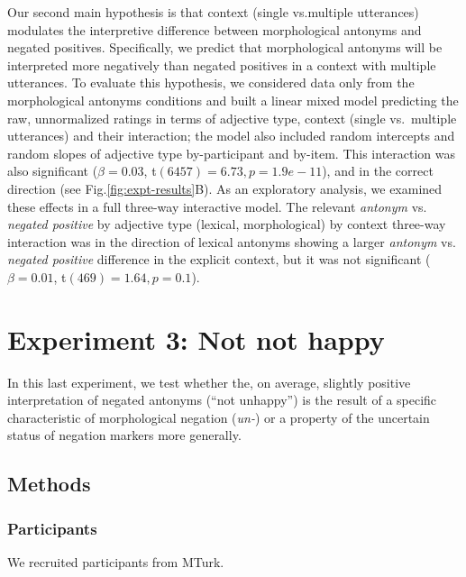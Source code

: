 \documentclass[floatsintext,doc]{apa6}
\begin{document}
Our second main hypothesis is that context (single vs.\text{~}multiple utterances) modulates the interpretive difference between morphological antonyms and negated positives.
Specifically, we predict that morphological antonyms will be interpreted more negatively than negated positives in a context with multiple utterances.
To evaluate this hypothesis, we considered data only from the morphological antonyms conditions and built a linear mixed model predicting the raw, unnormalized ratings in terms of adjective type,
context (single vs.~multiple utterances) and their interaction; the model also included random intercepts and random slopes of adjective type by-participant and by-item.
This interaction was also significant (\(\beta = 0.03\), t\((6457) = 6.73, p = 1.9e-11\)), and in the correct direction (see Fig.\text{~}\ref{fig:expt-results}B).
As an exploratory analysis, we examined these effects in a full three-way interactive model.
The relevant \emph{antonym} vs. \emph{negated positive} by adjective type (lexical, morphological) by context three-way interaction was in the direction of lexical antonyms showing a larger \emph{antonym} vs. \emph{negated positive} difference in the explicit context, but it was not significant (\(\beta = 0.01\), t\((469) = 1.64, p = 0.1\)).


\section{Experiment 3: Not not happy}\label{experiment-3-notnot}

In this last experiment, we test whether the, on average, slightly positive interpretation of negated antonyms (``not unhappy'') is the result of a specific characteristic of morphological negation (\emph{un-}) or a property of the uncertain status of negation markers more generally. 

\subsection{Methods}

\subsubsection{Participants}\label{participants-3}

We recruited  participants from MTurk.
\end{document}
